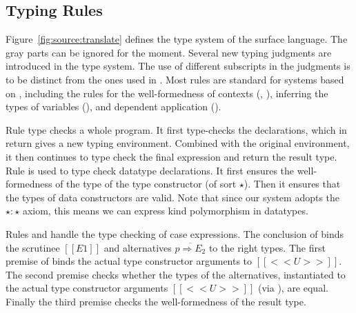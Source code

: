 \begin{comment}
\paragraph{Syntactic Sugar}
For the sake of programming, \sufcc employs some syntactic sugar shown
in Figure \ref{fig:surface:syntax}. A non-dependent function type can
be written as $[[A1 -> A2]]$. A dependent function type
$[[Pi x : A1 . A2]]$ is abbreviated as $[[(x : A1) -> A2]]$ for easier
reading. A standard $\mathbf{letrec}$ construct is used to build
recursive functions. We also introduce a Haskell-like record syntax,
which are desugared to datatypes with accompanying selector functions.
\end{comment}


\subsection{Typing Rules}
Figure~\ref{fig:source:translate} defines the type system of the
surface language. The gray parts can be ignored for the
moment. Several new typing judgments are introduced in the type
system. The use of different subscripts in the judgments is to be
distinct from the ones used in \name. Most rules are standard for
systems based on \coc, including the rules for the well-formedness of
contexts (, ), inferring the
types of variables (), and dependent application
().


Rule  type checks a whole program. It first
type-checks the declarations, which in return gives a new typing
environment. Combined with the original environment, it then continues
to type check the final expression and return the result type. Rule
 is used to type check datatype declarations. It
first ensures the well-formedness of the type of the type constructor
(of sort $\star$). Then it ensures that the types of data constructors
are valid.  Note that since our system adopts the $\star : \star$
axiom, this means we can express kind polymorphism in datatypes.

Rules  and  handle the type
checking of case expressions. The conclusion of 
binds the scrutinee $[[E1]]$ and alternatives
$\overline{p \Rightarrow E_2}$ to the right types. The first premise
of  binds the actual type constructor arguments to
$[[<<U>>]]$. The second premise checks whether the types of the
alternatives, instantiated to the actual type constructor arguments
$[[<<U>>]]$ (via ), are equal. Finally the third
premise checks the well-formedness of the result type.

